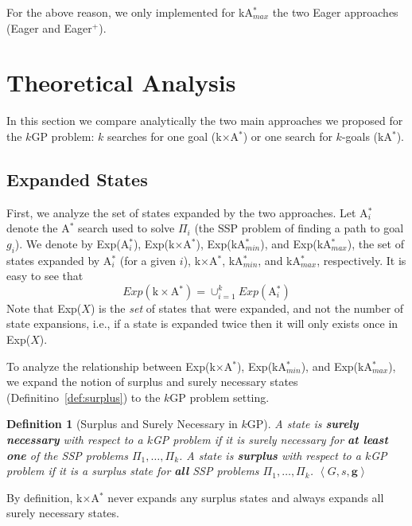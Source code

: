 \documentclass{aicom2e}
\newtheorem{definition}{Definition}
\newcommand{\kgs}{$k$GP}
\newcommand{\astar}{A$^*$}
\newcommand{\kastar}{kA$^*$}
\newcommand{\kastarmin}{kA$^*_{min}$}
\newcommand{\kastarmax}{kA$^*_{max}$}
\newcommand{\kxastar}{k$\times$A$^*$}
\newcommand{\astari}[1]{A$^*_#1$}
\newcommand{\tuple}[1]{\ensuremath{\left \langle #1 \right \rangle }}
\newcommand{\open}{\textsc{Open}}
\begin{document}
For the above reason, we only implemented for \kastarmax{} the two Eager approaches (Eager and Eager$^+$).


\section{Theoretical Analysis}
\label{sec:theoretical-analysis}

In this section we compare analytically the two main approaches we proposed for
the \kgs{} problem: $k$ searches for one goal (\kxastar{}) or one search for
$k$-goals (\kastar{}).

\subsection{Expanded States}
\label{sec:expandedStates}
First, we analyze the set of states expanded by the two approaches.
Let \astari{i} denote   the \astar{} search used to solve $\Pi_i$ (the SSP problem of finding a path to goal $g_i$).
We denote by Exp(\astari{i}), Exp(\kxastar{}), Exp(\kastarmin), and Exp(\kastarmax),
the set of states expanded by \astari{i} (for a given $i$), \kxastar{}, \kastarmin, and \kastarmax{}, respectively.
It is easy to see that
\[ Exp(\text{\kxastar{}})=\cup_{i=1}^k Exp(\text{\astari{i}}) \]
Note that Exp($X$) is the {\em set} of states that were expanded, and not the number of state expansions, i.e., if a state is expanded twice then it will only exists once in Exp($X$).


To analyze the relationship between Exp(\kxastar{}), Exp(\kastarmin), and Exp(\kastarmax), we expand the notion of surplus and surely necessary states (Definitino~\ref{def:surplus}) to the \kgs{} problem setting.
\begin{definition}[Surplus and Surely Necessary in \kgs{}]
    A state is {\bf surely necessary} with respect to a \kgs{} problem
    if it is surely necessary for {\bf at least one} of the SSP problems $\Pi_1,\ldots, \Pi_k$.
    A state is {\bf surplus} with respect to a \kgs{} problem
    if it is a surplus state for {\bf all} SSP problems $\Pi_1,\ldots, \Pi_k$.
    $\tuple{G,s, \textbf{g}}$
\label{def:surplus-k-goal}
\end{definition}
By definition, \kxastar{} never expands any surplus states and always expands 
all surely necessary states. 
\end{document}
